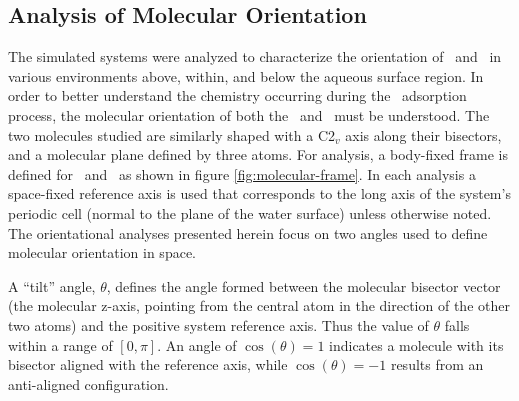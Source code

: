 

\subsection{Analysis of Molecular Orientation}

	The simulated systems were analyzed to characterize the orientation of \wat~and \suldiox~in various environments above, within, and below the aqueous surface region. In order to better understand the chemistry occurring during the \suldiox~adsorption process, the molecular orientation of both the \was~and \suldiox~must be understood.  The two molecules studied are similarly shaped with a C2$_v$ axis along their bisectors, and a molecular plane defined by three atoms. For analysis, a body-fixed frame is defined for \wat~and \suldiox~as shown in figure \ref{fig:molecular-frame}. In each analysis a space-fixed reference axis is used that corresponds to the long axis of the system's periodic cell (normal to the plane of the water surface) unless otherwise noted. The orientational analyses presented herein focus on two angles used to define molecular orientation in space. 
	
	A ``tilt'' angle, $\theta$, defines the angle formed between the molecular bisector vector (the molecular z-axis, pointing from the central atom in the direction of the other two atoms) and the positive system reference axis. Thus the value of $\theta$ falls within a range of $[0,\pi]$. An angle of $\cos(\theta)=1$ indicates a molecule with its bisector aligned with the reference axis, while $\cos(\theta)=-1$ results from an anti-aligned configuration. 
	
